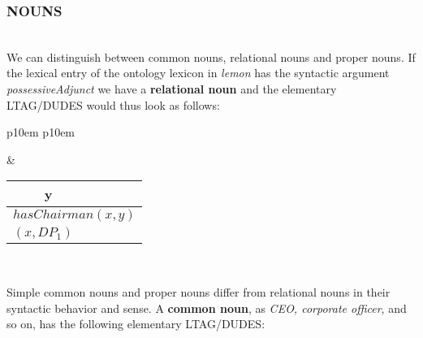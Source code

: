 \subsubsection{NOUNS}\mbox{}\\
We can distinguish between common nouns, relational nouns and proper nouns. If the lexical entry of the ontology lexicon in \textit{lemon} has the syntactic argument \textit{possessiveAdjunct} we have a \textbf{relational noun} and the elementary LTAG/DUDES would thus look as follows: 

\medskip
\begin{center}
\begin{tabular}{ p{10em} p{10em} }
	\label{tbl:grammar.chairmanOf}
	
	\begin{center}
		\begin{tikzpicture}
		\Tree [.NP [.N chairman ] [.PP [.P of ] DP$_1\downarrow$ ] ]
		\end{tikzpicture}
	\end{center}
		
	&
	
	\begin{center}
		\begin{tabular}{|c|l|}
			\hline
			y & \mbox{}\\ 
			\hline
			\multicolumn{2}{|l|}{
				$hasChairman(x,y)$
			} \\
			\hline
			\multicolumn{2}{|l|}{
				$(x,DP_{1})$
			} \\
			\hline
		\end{tabular}
	\end{center}	
	\\
\end{tabular}
\end{center}
\medskip

Simple common nouns and proper nouns differ from relational nouns in their syntactic behavior and sense. A \textbf{common noun}, as \textit{CEO, corporate officer}, and so on, has the following elementary LTAG/DUDES:

